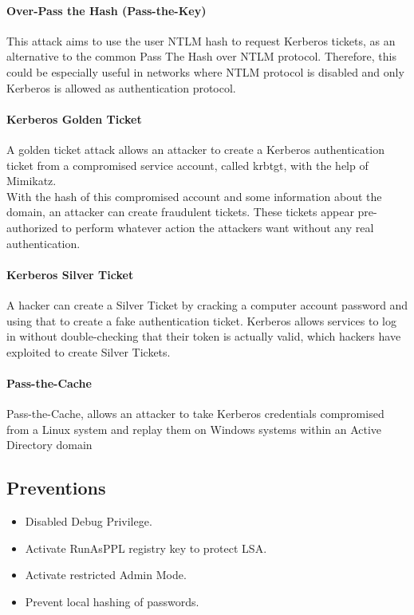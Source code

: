 \paragraph{Over-Pass the Hash (Pass-the-Key)}
This attack aims to use the user NTLM hash to request Kerberos tickets, as an alternative to the common Pass The Hash over NTLM protocol. Therefore, this could be especially useful in networks where NTLM protocol is disabled and only Kerberos is allowed as authentication protocol.

\paragraph{Kerberos Golden Ticket}
A golden ticket attack allows an attacker to create a Kerberos authentication ticket from a compromised service account, called krbtgt, with the help of Mimikatz. \\

With the hash of this compromised account and some information about the domain, an attacker can create fraudulent tickets. These tickets appear pre-authorized to perform whatever action the attackers want without any real authentication.

\paragraph{Kerberos Silver Ticket}
A hacker can create a Silver Ticket by cracking a computer account password and using that to create a fake authentication ticket. Kerberos allows services to log in without double-checking that their token is actually valid, which hackers have exploited to create Silver Tickets.

\paragraph{Pass-the-Cache}
Pass-the-Cache, allows an attacker to take Kerberos credentials compromised from a Linux system and replay them on Windows systems within an Active Directory domain

\subsection{Preventions}
\begin{itemize}
  \item Disabled Debug Privilege.
  \item Activate RunAsPPL registry key to protect LSA.
  \item Activate restricted Admin Mode.
  \item Prevent local hashing of passwords.
\end{itemize}

